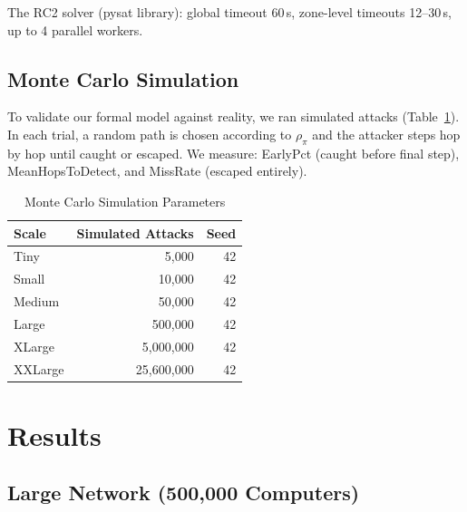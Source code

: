 \documentclass[journal]{IEEEtran}
\newcommand{\rcII}{\textsc{RC2}}
\begin{document}
The \rcII{} solver (pysat library): global timeout 60\,s,
zone-level timeouts 12--30\,s, up to 4 parallel workers.

\subsection{Monte Carlo Simulation}

To validate our formal model against reality, we ran
simulated attacks (Table~\ref{tab:montecarlo}).
In each trial, a random path is chosen according to $\rho_\pi$
and the attacker steps hop by hop until caught or escaped.
We measure: EarlyPct (caught before final step),
MeanHopsToDetect, and MissRate (escaped entirely).

\begin{table}[htbp]
\caption{Monte Carlo Simulation Parameters}
\label{tab:montecarlo}
\centering
\renewcommand{\arraystretch}{1.2}
\begin{tabular}{@{}lrr@{}}
\toprule
\textbf{Scale} & \textbf{Simulated Attacks} &
\textbf{Seed} \\
\midrule
Tiny    &       5,000 & 42 \\
Small   &      10,000 & 42 \\
Medium  &      50,000 & 42 \\
Large   &     500,000 & 42 \\
XLarge  &   5,000,000 & 42 \\
XXLarge &  25,600,000 & 42 \\
\bottomrule
\end{tabular}
\end{table}

\section{Results}
\label{sec:results}

\subsection{Large Network (500,000 Computers)}
\end{document}
